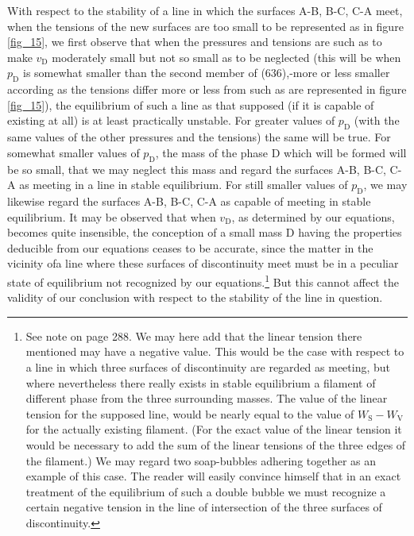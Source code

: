 \documentclass[12pt]{article}
\begin{document}
With respect to the stability of a line in which the surfaces A-B, B-C, C-A meet, when the tensions of the new surfaces are too small to be represented as in figure \ref{fig_15}, we first observe that when the pressures and tensions are such as to make $v_\text{D}$ moderately small but not so small as to be neglected (this will be when $p_\text{D}$ is somewhat smaller than the second member of (636),-more or less smaller according as the tensions differ more or less from such as are represented in figure \ref{fig_15}), the equilibrium of such a line as that supposed (if it is capable of existing at all) is at least practically unstable. For greater values of $p_\text{D}$ (with the same values of the other pressures and the tensions) the same will be true.  For somewhat smaller values of $p_\text{D}$, the mass of the phase D which will be formed will be so small, that we may neglect this mass and regard the surfaces A-B, B-C, C-A as meeting in a line in stable equilibrium. For still smaller values of $p_\text{D}$, we may likewise regard the surfaces A-B, B-C, C-A as capable of meeting in stable equilibrium. It may be observed that when $v_\text{D}$, as determined by our equations, becomes quite insensible, the conception of a small mass D having the properties deducible from our equations ceases to be accurate, since the matter in the vicinity ofa line where these surfaces of discontinuity meet must be in a peculiar state of equilibrium not recognized by our equations.\footnote{See note on page 288. We may here add that the linear tension there mentioned may have a negative value. This would be the case with respect to a line in which three surfaces of discontinuity are regarded as meeting, but where nevertheless there really exists in stable equilibrium a filament of different phase from the three surrounding masses. The value of the linear tension for the supposed line, would be nearly equal to the value of $W_\text{S}-W_\text{V}$ for the actually existing filament. (For the exact value of the linear tension it would be necessary to add the sum of the linear tensions of the three edges of the filament.) We may regard two soap-bubbles adhering together as an example of this case. The reader will easily convince himself that in an exact treatment of the equilibrium of such a double bubble we must recognize a certain negative tension in the line of intersection of the three surfaces of discontinuity.} But this cannot affect the validity of our conclusion with respect to the stability of the line in question.
\end{document}
